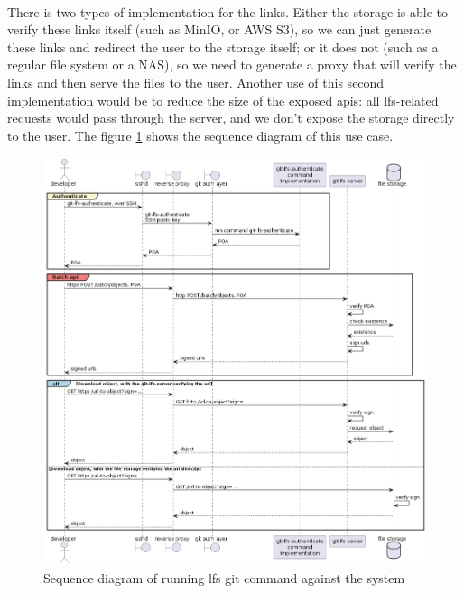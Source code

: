 \paragraph{}
There is two types of implementation for the links. Either the storage is able to verify these links itself (such as MinIO, or AWS S3), so we can just generate these links and redirect the user to the storage itself; or it does not (such as a regular file system or a NAS), so we need to generate a proxy that will verify the links and then serve the files to the user. Another use of this second implementation would be to reduce the size of the exposed apis: all lfs-related requests would pass through the server, and we don't expose the storage directly to the user. The figure \ref{fig:sequence_lfs} shows the sequence diagram of this use case.


\begin{figure}[ht]
    \centering
    \includegraphics[width=1\textwidth]{iteration_01/diagrams/sequence_lfs.png}
    \caption{Sequence diagram of running lfs git command against the system}
    \label{fig:sequence_lfs}
\end{figure}
